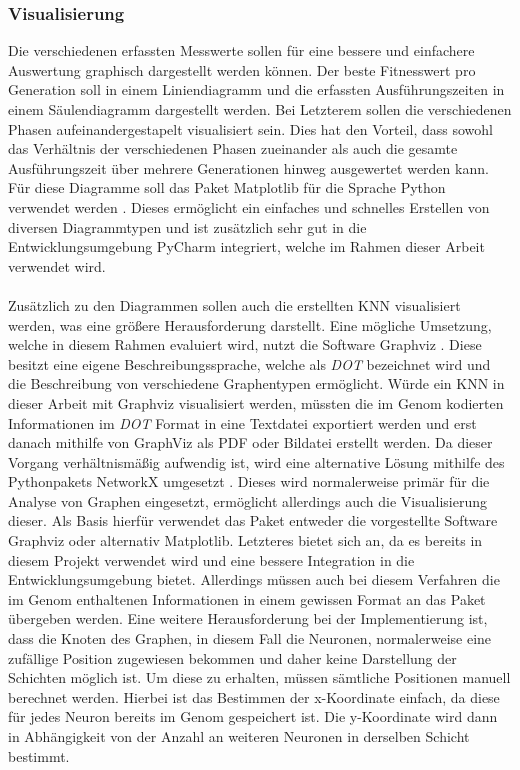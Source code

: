 \subsubsection{Visualisierung}
Die verschiedenen erfassten Messwerte sollen für eine bessere und einfachere Auswertung graphisch dargestellt werden können. Der beste Fitnesswert pro Generation soll in einem Liniendiagramm und die erfassten Ausführungszeiten in einem Säulendiagramm dargestellt werden. Bei Letzterem sollen die verschiedenen Phasen aufeinandergestapelt visualisiert sein. Dies hat den Vorteil, dass sowohl das Verhältnis der verschiedenen Phasen zueinander als auch die gesamte Ausführungszeit über mehrere Generationen hinweg ausgewertet werden kann. Für diese Diagramme soll das Paket Matplotlib für die Sprache Python verwendet werden \cite{pyplot2007hunter}. Dieses ermöglicht ein einfaches und schnelles Erstellen von diversen Diagrammtypen und ist zusätzlich sehr gut in die Entwicklungsumgebung PyCharm integriert, welche im Rahmen dieser Arbeit verwendet wird.
\\\\
Zusätzlich zu den Diagrammen sollen auch die erstellten \ac{KNN} visualisiert werden, was eine größere Herausforderung darstellt. Eine mögliche Umsetzung, welche in diesem Rahmen evaluiert wird, nutzt die Software Graphviz \cite{graphviz2000gansner}. Diese besitzt eine eigene Beschreibungssprache, welche als \emph{DOT} bezeichnet wird und die Beschreibung von verschiedene Graphentypen ermöglicht. Würde ein \ac{KNN} in dieser Arbeit mit Graphviz visualisiert werden, müssten die im  Genom kodierten Informationen im \emph{DOT} Format in eine Textdatei exportiert werden und erst danach mithilfe von GraphViz als PDF oder Bildatei erstellt werden. Da dieser Vorgang verhältnismäßig aufwendig ist, wird eine alternative Lösung mithilfe des Pythonpakets NetworkX umgesetzt \cite{networkx2008hagberg}. Dieses wird normalerweise primär für die Analyse von Graphen eingesetzt, ermöglicht allerdings auch die Visualisierung dieser. Als Basis hierfür verwendet das Paket entweder die vorgestellte Software Graphviz oder alternativ Matplotlib. 
Letzteres bietet sich   an, da es bereits in diesem Projekt verwendet wird und eine bessere Integration in die Entwicklungsumgebung bietet. Allerdings müssen auch bei diesem Verfahren die im Genom enthaltenen Informationen in einem gewissen Format an das Paket übergeben werden. Eine weitere Herausforderung bei der Implementierung ist, dass die Knoten des Graphen, in diesem Fall die Neuronen, normalerweise eine zufällige Position zugewiesen bekommen und daher keine Darstellung der Schichten möglich ist. Um diese zu erhalten, müssen sämtliche Positionen manuell berechnet werden. Hierbei ist das Bestimmen der x-Koordinate einfach, da diese für jedes Neuron bereits im Genom gespeichert ist. Die y-Koordinate wird dann in Abhängigkeit von der Anzahl an weiteren Neuronen in derselben Schicht bestimmt.    

